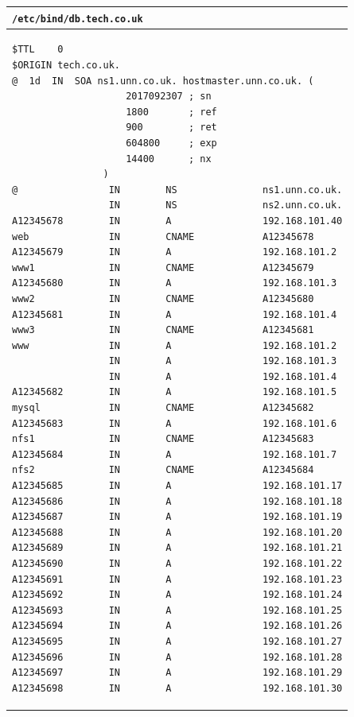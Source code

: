 \documentclass[11pt]{article}
\begin{document}
\begin{table}[ht]
    \begin{tabular}{|p{17.5cm}|} 
        \hline
        \texttt{\textbf{/etc/bind/db.tech.co.uk}}\\ 
        \hline
        \lstset{
                basicstyle=\scriptsize\ttfamily,
              }
              \begin{lstlisting}
$TTL    0 
$ORIGIN tech.co.uk.
@  1d  IN  SOA ns1.unn.co.uk. hostmaster.unn.co.uk. (
                    2017092307 ; sn
                    1800       ; ref
                    900        ; ret
                    604800     ; exp
                    14400      ; nx
                )
@                IN        NS               ns1.unn.co.uk.
                 IN        NS               ns2.unn.co.uk.
A12345678        IN        A                192.168.101.40
web              IN        CNAME            A12345678
A12345679        IN        A                192.168.101.2
www1             IN        CNAME            A12345679
A12345680        IN        A                192.168.101.3
www2             IN        CNAME            A12345680
A12345681        IN        A                192.168.101.4
www3             IN        CNAME            A12345681
www              IN        A                192.168.101.2
                 IN        A                192.168.101.3
                 IN        A                192.168.101.4
A12345682        IN        A                192.168.101.5
mysql            IN        CNAME            A12345682
A12345683        IN        A                192.168.101.6
nfs1             IN        CNAME            A12345683
A12345684        IN        A                192.168.101.7
nfs2             IN        CNAME            A12345684
A12345685        IN        A                192.168.101.17
A12345686        IN        A                192.168.101.18
A12345687        IN        A                192.168.101.19
A12345688        IN        A                192.168.101.20
A12345689        IN        A                192.168.101.21
A12345690        IN        A                192.168.101.22
A12345691        IN        A                192.168.101.23
A12345692        IN        A                192.168.101.24
A12345693        IN        A                192.168.101.25
A12345694        IN        A                192.168.101.26
A12345695        IN        A                192.168.101.27
A12345696        IN        A                192.168.101.28
A12345697        IN        A                192.168.101.29
A12345698        IN        A                192.168.101.30
        \end{lstlisting}\\
        \hline
    \end{tabular}
\end{table}
\end{document}

